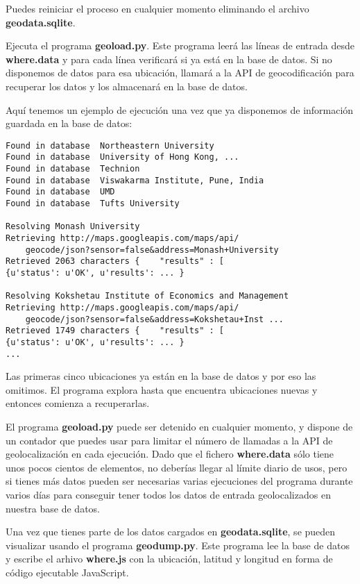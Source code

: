 Puedes reiniciar el proceso en cualquier momento eliminando el archivo
{\bf geodata.sqlite}.

Ejecuta el programa {\bf geoload.py}. Este programa leerá las líneas
de entrada desde {\bf where.data} y para cada línea verificará si ya
está en la base de datos. Si no disponemos de datos para esa ubicación,
llamará a la API de geocodificación para recuperar los datos y los almacenará
en la base de datos.

Aquí tenemos un ejemplo de ejecución una vez que ya disponemos de información guardada en la
base de datos:

\beforeverb
\begin{verbatim}
Found in database  Northeastern University
Found in database  University of Hong Kong, ...
Found in database  Technion
Found in database  Viswakarma Institute, Pune, India
Found in database  UMD
Found in database  Tufts University

Resolving Monash University
Retrieving http://maps.googleapis.com/maps/api/
    geocode/json?sensor=false&address=Monash+University
Retrieved 2063 characters {    "results" : [  
{u'status': u'OK', u'results': ... }

Resolving Kokshetau Institute of Economics and Management
Retrieving http://maps.googleapis.com/maps/api/
    geocode/json?sensor=false&address=Kokshetau+Inst ...
Retrieved 1749 characters {    "results" : [  
{u'status': u'OK', u'results': ... }
...
\end{verbatim}
\afterverb
%
Las primeras cinco ubicaciones ya están en la base de datos y por eso
las omitimos. El programa explora hasta que encuentra ubicaciones
nuevas y entonces comienza a recuperarlas.

El programa {\bf geoload.py} puede ser detenido en cualquier momento, y dispone de un
contador que puedes usar para limitar el número de llamadas a la API de geolocalización
en cada ejecución. Dado que el fichero {\bf where.data} sólo tiene unos pocos cientos
de elementos, no deberías llegar al límite diario de usos, pero si
tienes más datos pueden ser necesarias varias ejecuciones del programa durante varios días
para conseguir tener todos los datos de entrada geolocalizados en nuestra base de datos.

Una vez que tienes parte de los datos cargados en {\bf geodata.sqlite}, se pueden
visualizar usando el programa {\bf geodump.py}. Este
programa lee la base de datos y escribe el arhivo {\bf where.js}
con la ubicación, latitud y longitud en forma de
código ejecutable JavaScript.


